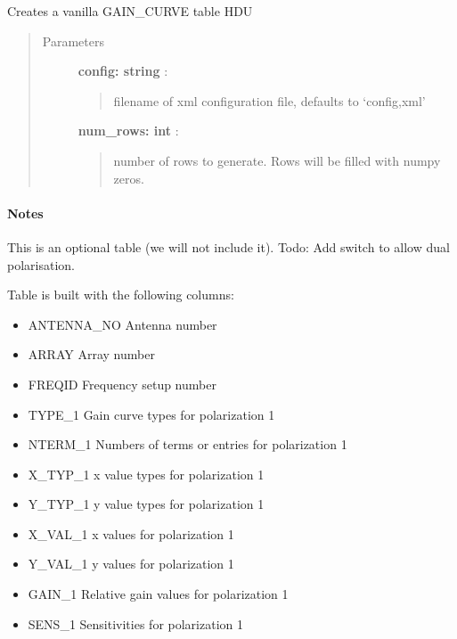 \documentclass[letterpaper,10pt,english]{sphinxmanual}
\begin{document}
\begin{fulllineitems}
\label{index:pyFitsidi.make_gain_curve}
Creates a vanilla GAIN\_CURVE table HDU
\begin{quote}\begin{description}
\item[{Parameters }] \leavevmode
\textbf{config: string} :
\begin{quote}

filename of xml configuration file, defaults to `config,xml'
\end{quote}

\textbf{num\_rows: int} :
\begin{quote}

number of rows to generate. Rows will be filled with numpy zeros.
\end{quote}

\end{description}\end{quote}
\paragraph{Notes}

This is an optional table (we will not include it). 
Todo: Add switch to allow dual polarisation.

Table is built with the following columns:
\begin{itemize}
\item {} 
ANTENNA\_NO  Antenna number

\item {} 
ARRAY       Array number

\item {} 
FREQID      Frequency setup number

\item {} 
TYPE\_1      Gain curve types for polarization 1

\item {} 
NTERM\_1     Numbers of terms or entries for polarization 1

\item {} 
X\_TYP\_1     x value types for polarization 1

\item {} 
Y\_TYP\_1     y value types for polarization 1

\item {} 
X\_VAL\_1     x values for polarization 1

\item {} 
Y\_VAL\_1     y values for polarization 1

\item {} 
GAIN\_1      Relative gain values for polarization 1

\item {} 
SENS\_1      Sensitivities for polarization 1

\end{itemize}

\end{fulllineitems}
\end{document}
